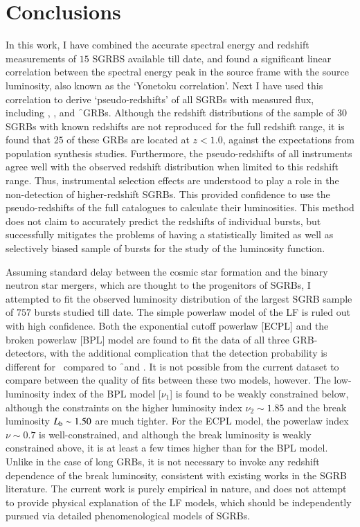 \section{Conclusions}
\label{sec:conclusions--SGRBs}
In this work, I have combined the accurate spectral energy and redshift measurements of $15$ SGRBS available till date, and found a significant linear correlation between the spectral energy peak in the source frame with the source luminosity, also known as the `Yonetoku correlation'. Next I have used this correlation to derive `pseudo-redshifts' of all SGRBs with measured flux, including \B, \s, and \f\ GRBs. Although the redshift distributions of the sample of $30$ SGRBs with known redshifts are not reproduced for the full redshift range, it is found that $25$ of these GRBs are located at $z < 1.0$, against the expectations from population synthesis studies. Furthermore, the pseudo-redshifts of all instruments agree well with the observed redshift distribution when limited to this redshift range. Thus, instrumental selection effects are understood to play a role in the non-detection of higher-redshift SGRBs. This provided confidence to use the pseudo-redshifts of the full catalogues to calculate their luminosities. This method does not claim to accurately predict the redshifts of individual bursts, but successfully mitigates the problems of having a statistically limited as well as selectively biased sample of bursts for the study of the luminosity function.

Assuming standard delay between the cosmic star formation and the binary neutron star mergers, which are thought to the progenitors of SGRBs, I attempted to fit the observed luminosity distribution of the largest SGRB sample of $757$ bursts studied till date. The simple powerlaw model of the LF is ruled out with high confidence. Both the exponential cutoff powerlaw [ECPL] and the broken powerlaw [BPL] model are found to fit the data of all three GRB-detectors, with the additional complication that the detection probability is different for \B\ compared to \f\ and \s. It is not possible from the current dataset to compare between the quality of fits between these two models, however. The low-luminosity index of the BPL model [$\nu_1$] is found to be weakly constrained below, although the constraints on the higher luminosity index $\nu_2 \sim 1.85$ and the break luminosity $L_{\rm{b}} \sim 1.50$ are much tighter. For the ECPL model, the powerlaw index $\nu \sim 0.7$ is well-constrained, and although the break luminosity is weakly constrained above, it is at least a few times higher than for the BPL model. Unlike in the case of long GRBs, it is not necessary to invoke any redshift dependence of the break luminosity, consistent with existing works in the SGRB literature. The current work is purely empirical in nature, and does not attempt to provide physical explanation of the LF models, which should be independently pursued via detailed phenomenological models of SGRBs.

